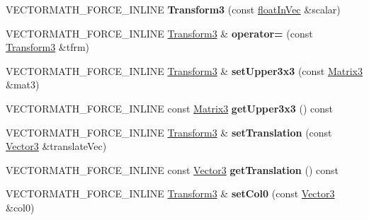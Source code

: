 \begin{DoxyCompactItemize}
V\+E\+C\+T\+O\+R\+M\+A\+T\+H\+\_\+\+F\+O\+R\+C\+E\+\_\+\+I\+N\+L\+I\+NE {\bfseries Transform3} (const \hyperlink{classVectormath_1_1floatInVec}{float\+In\+Vec} \&scalar)
\item 
\mbox{\label{classVectormath_1_1Aos_1_1Transform3_aaf980c7bc78620562ddff8728be1e1fd}} 
V\+E\+C\+T\+O\+R\+M\+A\+T\+H\+\_\+\+F\+O\+R\+C\+E\+\_\+\+I\+N\+L\+I\+NE \hyperlink{classVectormath_1_1Aos_1_1Transform3}{Transform3} \& {\bfseries operator=} (const \hyperlink{classVectormath_1_1Aos_1_1Transform3}{Transform3} \&tfrm)
\item 
\mbox{\label{classVectormath_1_1Aos_1_1Transform3_a6a737af9271bf0c90fc735946e33d3cc}} 
V\+E\+C\+T\+O\+R\+M\+A\+T\+H\+\_\+\+F\+O\+R\+C\+E\+\_\+\+I\+N\+L\+I\+NE \hyperlink{classVectormath_1_1Aos_1_1Transform3}{Transform3} \& {\bfseries set\+Upper3x3} (const \hyperlink{classVectormath_1_1Aos_1_1Matrix3}{Matrix3} \&mat3)
\item 
\mbox{\label{classVectormath_1_1Aos_1_1Transform3_ae1ec1edfa4a7165715be4aaec5ef83af}} 
V\+E\+C\+T\+O\+R\+M\+A\+T\+H\+\_\+\+F\+O\+R\+C\+E\+\_\+\+I\+N\+L\+I\+NE const \hyperlink{classVectormath_1_1Aos_1_1Matrix3}{Matrix3} {\bfseries get\+Upper3x3} () const
\item 
\mbox{\label{classVectormath_1_1Aos_1_1Transform3_aff8919d4868a4e1edc4556c1228cb821}} 
V\+E\+C\+T\+O\+R\+M\+A\+T\+H\+\_\+\+F\+O\+R\+C\+E\+\_\+\+I\+N\+L\+I\+NE \hyperlink{classVectormath_1_1Aos_1_1Transform3}{Transform3} \& {\bfseries set\+Translation} (const \hyperlink{classVectormath_1_1Aos_1_1Vector3}{Vector3} \&translate\+Vec)
\item 
\mbox{\label{classVectormath_1_1Aos_1_1Transform3_adb4174af6c3687eef0b294e4b7d54540}} 
V\+E\+C\+T\+O\+R\+M\+A\+T\+H\+\_\+\+F\+O\+R\+C\+E\+\_\+\+I\+N\+L\+I\+NE const \hyperlink{classVectormath_1_1Aos_1_1Vector3}{Vector3} {\bfseries get\+Translation} () const
\item 
\mbox{\label{classVectormath_1_1Aos_1_1Transform3_a11fcad93aede64b61f4c0a9c671a2951}} 
V\+E\+C\+T\+O\+R\+M\+A\+T\+H\+\_\+\+F\+O\+R\+C\+E\+\_\+\+I\+N\+L\+I\+NE \hyperlink{classVectormath_1_1Aos_1_1Transform3}{Transform3} \& {\bfseries set\+Col0} (const \hyperlink{classVectormath_1_1Aos_1_1Vector3}{Vector3} \&col0)

\end{DoxyCompactItemize}
